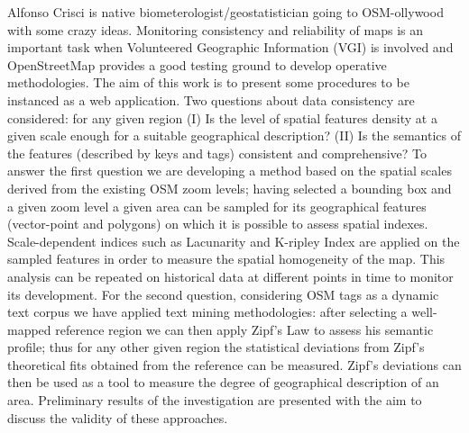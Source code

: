 %
{Alfonso Crisci is native biometerologist/geostatistician going to OSM-ollywood with some crazy ideas.}%
{Monitoring consistency and reliability of maps is an important task when Volunteered Geographic Information (VGI) is involved and OpenStreetMap provides a good testing ground to develop operative methodologies. The aim of this work is to present some procedures to be instanced as a web application. Two questions about data consistency are considered: for any given region (I) Is the level of spatial features density at a given scale enough for a suitable geographical description? (II) Is the semantics of the features (described by keys and tags) consistent and comprehensive?
To answer the first question we are developing a method based on the spatial scales derived from the existing OSM zoom levels; having selected a bounding box and a given zoom level a given area can be sampled for its geographical features (vector-point and polygons) on which it is possible to assess spatial indexes. Scale-dependent indices such as Lacunarity and K-ripley Index are applied on the sampled features in order to measure the spatial homogeneity of the map. This analysis can be repeated on historical data at different points in time to monitor its development. For the second question, considering OSM tags as a dynamic text corpus we have applied text mining methodologies: after selecting a well-mapped reference region we can then apply Zipf’s Law to assess his semantic profile; thus for any other given region the statistical deviations from Zipf's theoretical fits obtained from the reference can be measured. Zipf's deviations can then be used as a tool to measure the degree of geographical description of an area. Preliminary results of the investigation are presented with the aim to discuss the validity of these approaches.}

